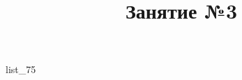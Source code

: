 \documentclass[12pt, a4paper]{article}
\begin{document}
	\title{Занятие №3}
	{list_75}
\end{document}
